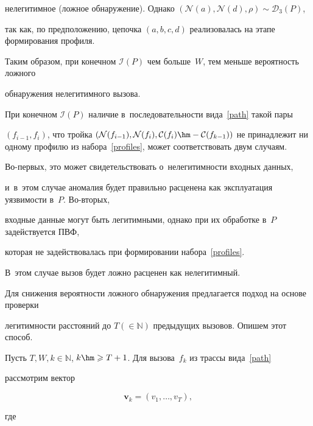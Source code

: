 нелегитимное (ложное обнаружение). Однако $(\mathcal{N}(a),\mathcal{N}(d), \rho)\sim \mathcal{D}_{3}(P)$,

 так как, по предположению, цепочка $(a,b,c,d)$ реализовалась на этапе формирования профиля. 

 Таким образом, при конечном $\mathcal{I}(P)$ чем больше~$W$, тем меньше вероятность ложного 

 обнаружения нелегитимного вызова. 



При конечном $\mathcal{I}(P)$ наличие в~последовательности вида~\eqref{path} такой пары 

$(f_{i-1},f_{i})$, что тройка $(\mathcal{N}(f_{i-1}),\mathcal{N}(f_{i}),\mathcal{C}(f_{i})\hm-\mathcal{C}

(f_{k-1}))$ не принадлежит ни одному профилю из набора~\eqref{profiles}, может соответствовать двум случаям.

 Во-пер\-вых, это может свидетельствовать о~нелегитимности входных данных, 

 и~в~этом случае аномалия будет правильно расценена как эксплуатация уязвимости в~$P$. Во-вто\-рых, 

 входные данные могут быть легитимными, однако при их обработке в~$P$ задействуется ПВФ, 

 которая не задействовалась при формировании набора~\eqref{profiles}. 

 В~этом случае вызов будет ложно расценен как нелегитимный. 

 Для снижения вероятности ложного обнаружения предлагается подход на основе проверки 

 легитимности расстояний до $T(\in\mathbb{N})$ предыдущих вызовов. Опишем этот способ.



Пусть $T,W,k\in \mathbb{N}$, $k\hm\geqslant T+1$. Для вызова~$f_{k}$  из трассы вида~\eqref{path} 

рассмотрим вектор 

\begin{equation}

\label{vector_v}

\mathbf{v}_{k}=\left(v_1,\ldots,v_T\right),

\end{equation}

где



\vspace*{-2pt}




